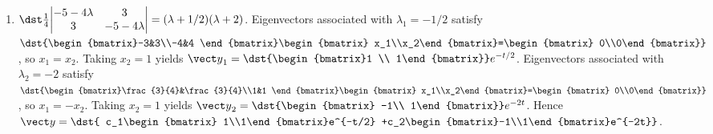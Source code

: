 \documentclass[openany]{book}
\newenvironment{sectionSolutions}{
 \begin{enumerate}[item-label={\thesection.\arabic{enumi}.}]
}{
 \end{enumerate}
}
\begin{document}
\begin{sectionSolutions}
\item
$\dst\frac{1}{4}{\begin{vmatrix}-5-4\lambda&3\\
3&-5-4\lambda\end{vmatrix}}
=(\lambda+1/2)(\lambda+2)$.
Eigenvectors  associated with $\lambda_1=-1/2$  satisfy
$\dst{\begin{bmatrix}-3&3\\-4&4
\end{bmatrix}\begin{bmatrix}
x_1\\x_2\end{bmatrix}=\begin{bmatrix} 0\\0\end{bmatrix}}$,
so $x_1=x_2$.  Taking $x_2=1$ yields
${\vect y}_1=\dst{\begin{bmatrix}1 \\
1\end{bmatrix}}e^{-t/2}$.
Eigenvectors  associated with $\lambda_2=-2$
satisfy
$\dst{\begin{bmatrix}\frac{3}{4}&\frac{3}{4}\\1&1
\end{bmatrix}\begin{bmatrix}
x_1\\x_2\end{bmatrix}=\begin{bmatrix} 0\\0\end{bmatrix}}$,
so $x_1=-x_2$.  Taking $x_2=1$ yields
${\vect y}_2=\dst{\begin{bmatrix} -1\\
1\end{bmatrix}}e^{-2t}$. Hence
 ${\vect y}=\dst{ c_1\begin{bmatrix} 1\\1\end{bmatrix}e^{-t/2}
 +c_2\begin{bmatrix}-1\\1\end{bmatrix}e^{-2t}}$.



\end{sectionSolutions}
\end{document}
